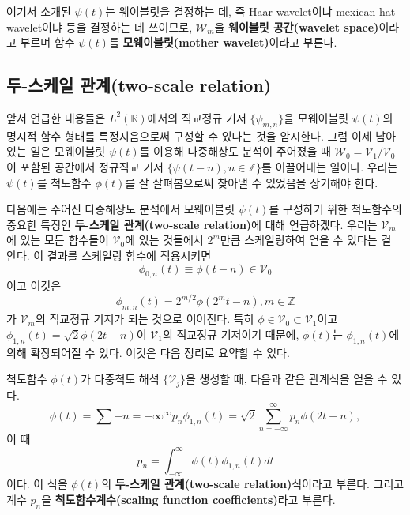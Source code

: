 \documentclass[b5paper,]{scrbook}
\theoremstyle{plain}
\theoremstyle{definition}
\numberwithin{equation}{section}
\let\BeginKnitrBlock\begin \let\EndKnitrBlock\end
\begin{document}
여기서 소개된 \(\psi(t)\)는 웨이블릿을 결정하는 데, 즉 Haar wavelet이냐 mexican hat wavelet이냐 등을 결정하는 데 쓰이므로, \(\mathcal{W}_{m}\)을 \textbf{웨이블릿 공간(wavelet space)}이라고 부르며 함수 \(\psi(t)\)를 \textbf{모웨이블릿(mother wavelet)}이라고 부른다.

\hypertarget{--two-scale-relation}{%
\subsection{두-스케일 관계(two-scale relation)}\label{--two-scale-relation}}

앞서 언급한 내용들은 \(L^{2}(\mathbb{R})\)에서의 직교정규 기저 \(\{\psi_{m,n} \}\)을 모웨이블릿 \(\psi(t)\)의 명시적 함수 형태를 특정지음으로써 구성할 수 있다는 것을 암시한다. 그럼 이제 남아있는 일은 모웨이블릿 \(\psi(t)\)를 이용해 다중해상도 분석이 주어졌을 때 \(\mathcal{W}_{0}=\mathcal{V}_{1}/\mathcal{V}_{0}\)이 포함된 공간에서 정규직교 기저 \(\{ \psi(t-n), n\in\mathbb{Z}\}\)를 이끌어내는 일이다. 우리는 \(\psi(t)\)를 척도함수 \(\phi(t)\)를 잘 살펴봄으로써 찾아낼 수 있었음을 상기해야 한다.

다음에는 주어진 다중해상도 분석에서 모웨이블릿 \(\psi(t)\)를 구성하기 위한 척도함수의 중요한 특징인 \textbf{두-스케일 관계(two-scale relation)}에 대해 언급하겠다. 우리는 \(\mathcal{V}_{m}\)에 있는 모든 함수들이 \(\mathcal{V}_{0}\)에 있는 것들에서 \(2^{m}\)만큼 스케일링하여 얻을 수 있다는 걸 안다. 이 결과를 스케일링 함수에 적용시키면
\[\phi_{0,n}(t)\equiv \phi(t-n) \in \mathcal{V}_{0}\]
이고 이것은
\[\phi_{m,n}(t)=2^{m/2}\phi(2^{m}t-n), m\in\mathbb{Z}\]
가 \(\mathcal{V}_{m}\)의 직교정규 기저가 되는 것으로 이어진다. 특히 \(\phi \in \mathcal{V}_{0}\subset \mathcal{V}_{1}\)이고 \(\phi_{1,n}(t)=\sqrt{2}\phi(2t-n)\)이 \(\mathcal{V}_{1}\)의 직교정규 기저이기 때문에, \(\phi(t)\)는 \(\phi_{1,n}(t)\)에 의해 확장되어질 수 있다. 이것은 다음 정리로 요약할 수 있다.

\BeginKnitrBlock{theorem}[두-스케일 관계]
\protect\hypertarget{thm:unnamed-chunk-264}{}{\label{thm:unnamed-chunk-264} {} }척도함수 \(\phi(t)\)가 다중척도 해석 \(\{ \mathcal{V}_{j}\}\)을 생성할 때, 다음과 같은 관계식을 얻을 수 있다.
\[\phi(t)=\sum-{n=-\infty}^{\infty}p_{n}\phi_{1,n}(t)=\sqrt{2}\sum_{n=-\infty}^{\infty}p_{n}\phi(2t-n),\]
이 때
\[p_{n}=\int_{-\infty}^{\infty}\phi(t)\phi_{1,n}(t)dt\]
이다. 이 식을 \(\phi(t)\)의 \textbf{두-스케일 관계(two-scale relation)}식이라고 부른다. 그리고 계수 \(p_{n}\)을 \textbf{척도함수계수(scaling function coefficients)}라고 부른다.
\EndKnitrBlock{theorem}
\end{document}
